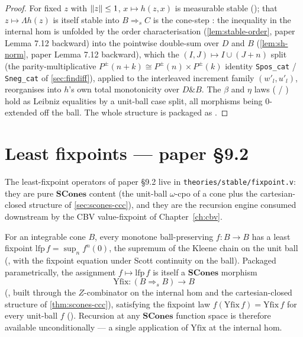 \begin{proof}
For fixed $z$ with $\lVert z \rVert \leq 1$, $x \mapsto h(z,x)$ is measurable
stable (); that $z \mapsto
\Lambda h(z)$ is itself stable into $B \mathbin{\Rightarrow_s} C$ is the
cone-step : the
inequality in the internal hom is unfolded by the order characterisation
(\autoref{lem:stable-order}, paper Lemma 7.12 backward) into the
pointwise double-sum over $D$ and $B$ (\autoref{lem:sh-norm}, paper
Lemma 7.12 backward), which the
$(I,J) \mapsto I \cup (J{+}n)$ split (the parity-multiplicative
$\mathit{P}^\pm(n{+}k) \cong \mathit{P}^\pm(n) \times \mathit{P}^\pm(k)$
identity \texttt{Spos\_cat} / \texttt{Sneg\_cat} of \autoref{sec:findiff}),
applied to the interleaved increment family $(w'_l, u'_l)$, reorganises
into $h$'s own total monotonicity over $D \mathbin{\&} B$. The
$\beta$ and $\eta$ laws ( /
) hold as Leibniz equalities by
a unit-ball case split, all morphisms being $0$-extended off the ball.
The whole structure is packaged as
.
\end{proof}

\section{Least fixpoints --- paper \S9.2}\label{sec:yfix}

The least-fixpoint operators of paper \S9.2 live in
\texttt{theories/stable/fixpoint.v}: they are pure $\mathbf{SCones}$
content (the unit-ball $\omega$-cpo of a cone plus the
cartesian-closed structure of \autoref{sec:scones-ccc}), and they are
the recursion engine consumed downstream by the CBV value-fixpoint of
Chapter~\ref{ch:cbv}.

\begin{lemma}\label{lem:yfix}
\rocqok
{}\rocqok
{}\rocqok
{}
For an integrable cone $B$, every monotone ball-preserving
$f : B \to B$ has a least fixpoint
$\mathrm{lfp}\,f = \sup_n f^n(0)$, the supremum of the Kleene chain on
the unit ball (, with the fixpoint
equation  under Scott
continuity on the ball). Packaged parametrically, the assignment
$f \mapsto \mathrm{lfp}\,f$ is itself a $\mathbf{SCones}$ morphism
\[
  \mathrm{Yfix} : (B \mathbin{\Rightarrow_s} B) \longrightarrow B
\]
(, built through the $Z$-combinator
on the internal hom and the cartesian-closed structure of
\autoref{thm:scones-ccc}), satisfying the fixpoint law
$f(\mathrm{Yfix}\,f) = \mathrm{Yfix}\,f$ for every unit-ball $f$
(). Recursion at any
$\mathbf{SCones}$ function space is therefore available
unconditionally --- a single application of $\mathrm{Yfix}$ at the
internal hom.
\end{lemma}

